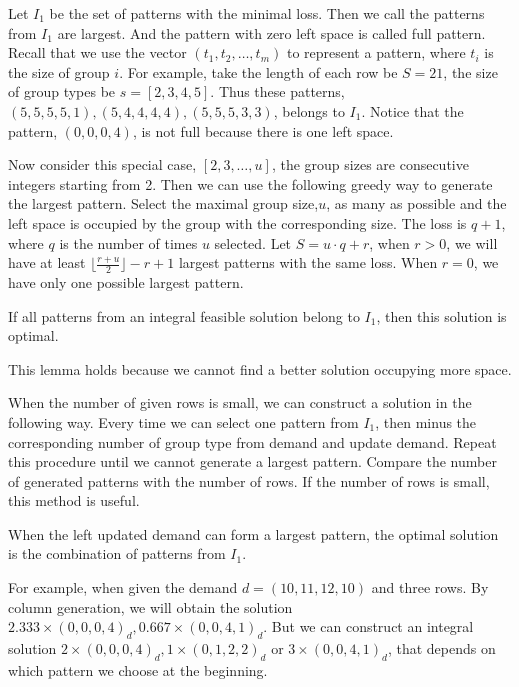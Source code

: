 Let $I_1$ be the set of patterns with the minimal loss. Then we call the patterns from $I_1$ are largest. And the pattern with zero left space is called full pattern.
Recall that we use the vector $(t_1,t_2,\ldots,t_m)$ to represent a pattern, where $t_i$ is the size of group $i$. For example, take the length of each row be $S = 21$, the size of group types be $s = [2,3,4,5]$. Thus these patterns, $(5,5,5,5,1),(5,4,4,4,4),(5,5,5,3,3)$, belongs to $I_1$. Notice that the pattern, $(0,0,0,4)$, is not full because there is one left space.

Now consider this special case, $[2,3,\ldots,u]$, the group sizes are consecutive integers starting from 2. Then we can use the following greedy way to generate the largest pattern. Select the maximal group size,$u$, as many as possible and the left space is occupied by the group with the corresponding size. The loss is $q+1$, where $q$ is the number of times $u$ selected. Let $S = u\cdot q + r$, when $r>0$, we will have at least $\lfloor \frac{r+u}{2} \rfloor -r +1$ largest patterns with the same loss. When $r =0$, we have only one possible largest pattern.

\begin{lem}
If all patterns from an integral feasible solution belong to $I_1$, then this solution is optimal.
\end{lem}

This lemma holds because we cannot find a better solution occupying more space.

When the number of given rows is small, we can construct a solution in the following way. Every time we can select one pattern from $I_1$, then minus the corresponding number of group type from demand and update demand. Repeat this procedure until we cannot generate a largest pattern. Compare the number of generated patterns with the number of rows. If the number of rows is small, this method is useful.

\begin{corollary}
When the left updated demand can form a largest pattern, the optimal solution is the combination of patterns from $I_1$.
\end{corollary}

For example, when given the demand $d = (10,11,12,10)$ and three rows.
By column generation, we will obtain the solution $2.333 \times (0,0,0,4)_d, 0.667 \times (0,0,4,1)_d$. But we can construct an integral solution $2 \times (0,0,0,4)_d, 1 \times (0,1,2,2)_d$ or $3 \times (0,0,4,1)_d$, that depends on which pattern we choose at the beginning.


